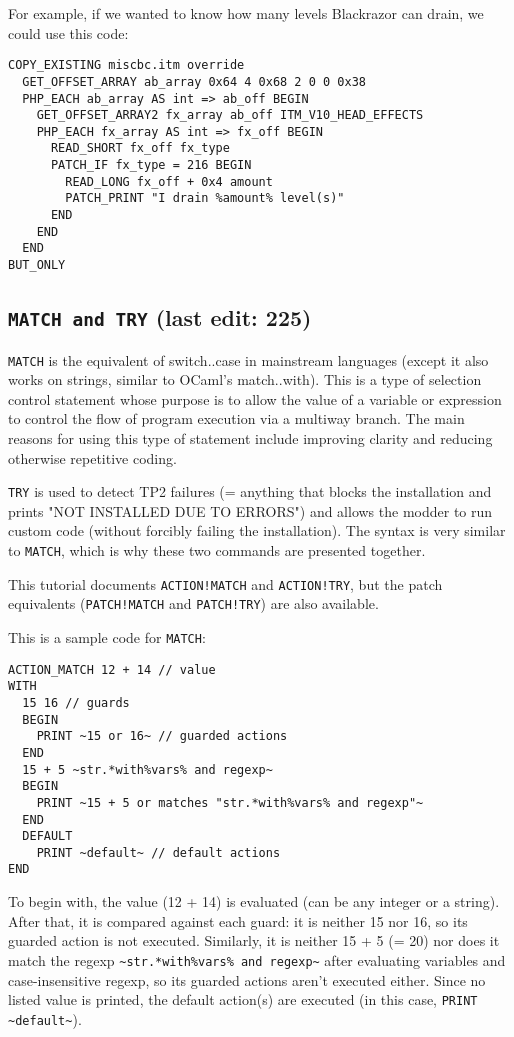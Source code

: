 \documentclass{article}
\def\DEFINE#1{{\tt \bf #1}\label{#1}\index{#1}}
\begin{document}
For example, if we wanted to know how many levels Blackrazor can drain, we could use this code:
\begin{verbatim}
COPY_EXISTING miscbc.itm override
  GET_OFFSET_ARRAY ab_array 0x64 4 0x68 2 0 0 0x38
  PHP_EACH ab_array AS int => ab_off BEGIN
    GET_OFFSET_ARRAY2 fx_array ab_off ITM_V10_HEAD_EFFECTS
    PHP_EACH fx_array AS int => fx_off BEGIN
      READ_SHORT fx_off fx_type
      PATCH_IF fx_type = 216 BEGIN
        READ_LONG fx_off + 0x4 amount
        PATCH_PRINT "I drain %amount% level(s)"
      END
    END
  END
BUT_ONLY
\end{verbatim}


\subsection{\DEFINE{MATCH and TRY} (last edit: 225)}

\verb+MATCH+ is the equivalent of switch..case in mainstream languages (except
it also works on strings, similar to OCaml's match..with). This is a type of
selection control statement whose purpose is to allow the value of a variable
or expression to control the flow of program execution via a multiway branch.
The main reasons for using this type of statement include improving clarity
and reducing otherwise repetitive coding.

\verb+TRY+ is used to detect TP2 failures (= anything that blocks the installation
and prints "NOT INSTALLED DUE TO ERRORS") and allows the modder to run custom
code (without forcibly failing the installation). The syntax is very similar
to \verb+MATCH+, which is why these two commands are presented together.

This tutorial documents \verb+ACTION!MATCH+ and \verb+ACTION!TRY+, but the
patch equivalents (\verb+PATCH!MATCH+ and \verb+PATCH!TRY+) are also
available.

This is a sample code for \verb+MATCH+:
\begin{verbatim}
ACTION_MATCH 12 + 14 // value
WITH
  15 16 // guards
  BEGIN
    PRINT ~15 or 16~ // guarded actions
  END
  15 + 5 ~str.*with%vars% and regexp~
  BEGIN
    PRINT ~15 + 5 or matches "str.*with%vars% and regexp"~
  END
  DEFAULT
    PRINT ~default~ // default actions
END
\end{verbatim}

To begin with, the value (12 + 14) is evaluated (can be any integer or a string).
After that, it is compared against each guard: it is neither 15 nor 16, so its
guarded action is not executed.  Similarly, it is neither 15 + 5 (= 20)
nor does it match the regexp \verb+~str.*with%vars% and regexp~+ after evaluating
variables and case-insensitive regexp, so its guarded actions aren't executed either.
Since no listed value is printed, the default action(s) are executed (in this case,
\verb+PRINT ~default~+).
\end{document}
